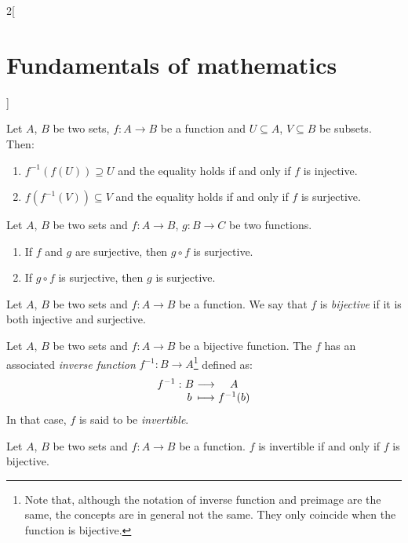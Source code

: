 \documentclass[../../../main_math.tex]{subfiles}
\begin{document}
\begin{multicols}{2}[\section{Fundamentals of mathematics}]
\begin{definition}
  \end{definition}
  \begin{proposition}
    Let $A$, $B$ be two sets, $f:A\rightarrow B$ be a function and $U\subseteq A$, $V\subseteq B$ be subsets. Then:
    \begin{enumerate}
      \item $f^{-1}(f(U))\supseteq U$ and the equality holds if and only if $f$ is injective.
      \item $f(f^{-1}(V))\subseteq V$ and the equality holds if and only if $f$ is surjective.
    \end{enumerate}
  \end{proposition}
  \begin{proposition}
    Let $A$, $B$ be two sets and $f:A\rightarrow B$, $g:B\rightarrow C$ be two functions.
    \begin{enumerate}
      \item If $f$ and $g$ are surjective, then $g\circ f$ is surjective.
      \item If $g\circ f$ is surjective, then $g$ is surjective.
    \end{enumerate}
  \end{proposition}
  \begin{definition}
    Let $A$, $B$ be two sets and $f:A\rightarrow B$ be a function. We say that $f$ is \emph{bijective} if it is both injective and surjective.
  \end{definition}
  \begin{proposition}
    Let $A$, $B$ be two sets and $f:A\rightarrow B$ be a bijective function. The $f$ has an associated \emph{inverse function} $f^{-1}:B\rightarrow A$\footnote{Note that, although the notation of inverse function and preimage are the same, the concepts are in general not the same. They only coincide when the function is bijective.} defined as:
    $$\function{f^{-1}}{B}{A}{b}{f^{-1}(b)}$$
    In that case, $f$ is said to be \emph{invertible}.
  \end{proposition}
  \begin{theorem}
    Let $A$, $B$ be two sets and $f:A\rightarrow B$ be a function. $f$ is invertible if and only if $f$ is bijective.
  \end{theorem}

\end{multicols}
\end{document}
